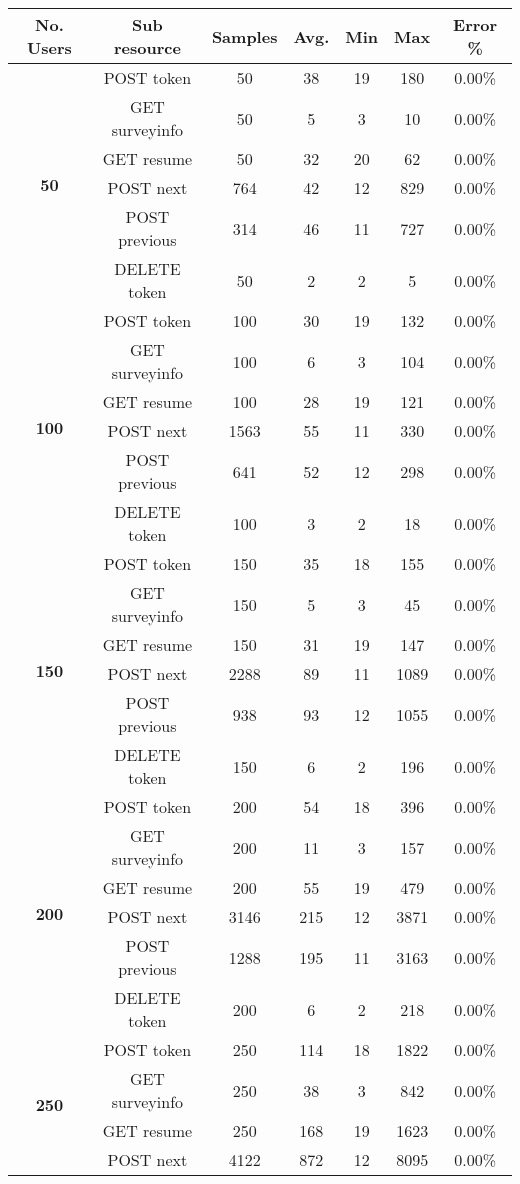 	\begin{table}[H]
	\centering
	\begin{tabular}{|c|c|c|c|c|c|c|}
		\hline 
		\textbf{No. Users} & \textbf{Sub resource} & \textbf{Samples} & \textbf{Avg.} & \textbf{Min} & \textbf{Max} & \textbf{Error \%}\tabularnewline
		\hline 
		\hline 
		\multirow{6}{*}{\textbf{50}} & POST token & 50 & 38 & 19 & 180 & 0.00\%\tabularnewline
		\cline{2-7} 
		 & GET surveyinfo & 50 & 5 & 3 & 10 & 0.00\%\tabularnewline
		\cline{2-7} 
		 & GET resume & 50 & 32 & 20 & 62 & 0.00\%\tabularnewline
		\cline{2-7} 
		 & POST next & 764 & 42 & 12 & 829 & 0.00\%\tabularnewline
		\cline{2-7} 
		 & POST previous & 314 & 46 & 11 & 727 & 0.00\%\tabularnewline
		\cline{2-7} 
		 & DELETE token & 50 & 2 & 2 & 5 & 0.00\%\tabularnewline
		\hline 
		\multirow{6}{*}{\textbf{100}} & POST token & 100 & 30 & 19 & 132 & 0.00\%\tabularnewline
		\cline{2-7} 
		 & GET surveyinfo & 100 & 6 & 3 & 104 & 0.00\%\tabularnewline
		\cline{2-7} 
		 & GET resume & 100 & 28 & 19 & 121 & 0.00\%\tabularnewline
		\cline{2-7} 
		 & POST next & 1563 & 55 & 11 & 330 & 0.00\%\tabularnewline
		\cline{2-7} 
		 & POST previous & 641 & 52 & 12 & 298 & 0.00\%\tabularnewline
		\cline{2-7} 
		 & DELETE token & 100 & 3 & 2 & 18 & 0.00\%\tabularnewline
		\hline 
		\multirow{6}{*}{\textbf{150}} & POST token & 150 & 35 & 18 & 155 & 0.00\%\tabularnewline
		\cline{2-7} 
		 & GET surveyinfo & 150 & 5 & 3 & 45 & 0.00\%\tabularnewline
		\cline{2-7} 
		 & GET resume & 150 & 31 & 19 & 147 & 0.00\%\tabularnewline
		\cline{2-7} 
		 & POST next & 2288 & 89 & 11 & 1089 & 0.00\%\tabularnewline
		\cline{2-7} 
		 & POST previous & 938 & 93 & 12 & 1055 & 0.00\%\tabularnewline
		\cline{2-7} 
		 & DELETE token & 150 & 6 & 2 & 196 & 0.00\%\tabularnewline
		\hline 
		\multirow{6}{*}{\textbf{200}} & POST token & 200 & 54 & 18 & 396 & 0.00\%\tabularnewline
		\cline{2-7} 
		 & GET surveyinfo & 200 & 11 & 3 & 157 & 0.00\%\tabularnewline
		\cline{2-7} 
		 & GET resume & 200 & 55 & 19 & 479 & 0.00\%\tabularnewline
		\cline{2-7} 
		 & POST next & 3146 & 215 & 12 & 3871 & 0.00\%\tabularnewline
		\cline{2-7} 
		 & POST previous & 1288 & 195 & 11 & 3163 & 0.00\%\tabularnewline
		\cline{2-7} 
		 & DELETE token & 200 & 6 & 2 & 218 & 0.00\%\tabularnewline
		\hline 
		\multirow{6}{*}{\textbf{250}} & POST token & 250 & 114 & 18 & 1822 & 0.00\%\tabularnewline
		\cline{2-7} 
		 & GET surveyinfo & 250 & 38 & 3 & 842 & 0.00\%\tabularnewline
		\cline{2-7} 
		 & GET resume & 250 & 168 & 19 & 1623 & 0.00\%\tabularnewline
		\cline{2-7} 
		 & POST next & 4122 & 872 & 12 & 8095 & 0.00\%\tabularnewline

\end{tabular}
\end{table}
